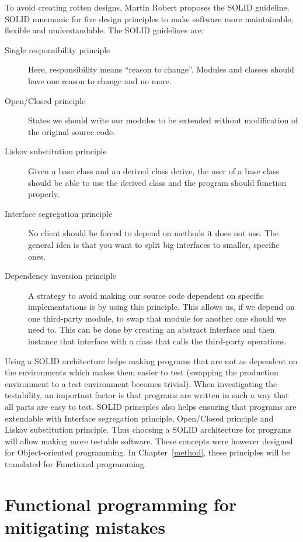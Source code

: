 To avoid creating rotten designs, Martin Robert proposes the SOLID guideline.
SOLID mnemonic for five design principles to make software more maintainable,
flexible and understandable. The SOLID guidelines are:

\begin{description}
    \item [Single responsibility principle] Here, responsibility means ``reason
        to change''. Modules and classes should have one reason to change and no
        more.
    \item [Open/Closed principle] States we should write our modules to be
        extended without modification of the original source code.
    \item [Liskov substitution principle] Given a base class and an derived
        class derive, the user of a base class should be able to use the derived
        class and the program should function properly.
    \item [Interface segregation principle] No client should be forced to depend
        on methods it does not use. The general idea is that you want to split
        big interfaces to smaller, specific ones.
    \item [Dependency inversion principle] A strategy to avoid making our source
        code dependent on specific implementations is by using this principle.
        This allows us, if we depend on one third-party module, to swap that
        module for another one should we need to. This can be done by creating
        an abstract interface and then instance that interface with a class that
        calls the third-party operations.~\cite{martinrobert}
\end{description}

Using a SOLID architecture helps making programs that are not as dependent on
the environments which makes them easier to test (swapping the production
environment to a test environment becomes trivial). When investigating the
testability, an important factor is that programs are written in such a way
that all parts are easy to test. SOLID principles also helps ensuring that
programs are extendable with Interface segregation principle, Open/Closed
principle and Liskov substitution principle. Thus choosing a SOLID architecture
for programs will allow making more testable software. These concepts were
however designed for Object-oriented programming. In Chapter~\ref{method},
these principles will be translated for Functional programming. 

\section{Functional programming for mitigating mistakes}

